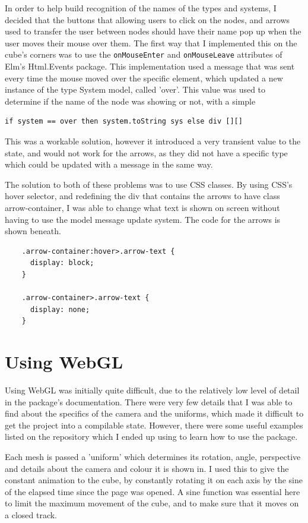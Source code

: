 \documentclass{l4proj}
\begin{document}
In order to help build recognition of the names of the types and systems, I decided that the buttons that allowing users to click on the nodes, and arrows used to transfer the user between nodes should have their name pop up when the user moves their mouse over them.  The first way that I implemented this on the cube's corners was to use the \texttt{onMouseEnter} and \texttt{onMouseLeave} attributes of Elm's Html.Events package.  This implementation used a message that was sent every time the mouse moved over the specific element, which updated a new instance of the type System model, called 'over'.  This value was used to determine if the name of the node was showing or not, with a simple 
\begin{lstlisting}
if system == over then system.toString sys else div [][]
\end{lstlisting}

This was a workable solution, however it introduced a very transient value to the state, and would not work for the arrows, as they did not have a specific type which could be updated with a message in the same way.

The solution to both of these problems was to use CSS classes.  By using CSS's hover selector, and redefining the div that contains the arrows to have class arrow-container, I was able to change what text is shown on screen without having to use the model message update system.  The code for the arrows is shown beneath.

\begin{lstlisting}
    .arrow-container:hover>.arrow-text {
      display: block;
    }

    .arrow-container>.arrow-text {
      display: none;
    }
\end{lstlisting}

\section{Using WebGL}

Using WebGL was initially quite difficult, due to the relatively low level of detail in the package's documentation.  There were very few details that I was able to find about the specifics of the camera and the uniforms, which made it difficult to get the project into a compilable state.  However, there were some useful examples listed on the repository which I ended up using to learn how to use the package.

Each mesh is passed a 'uniform' which determines its rotation, angle, perspective and details about the camera and colour it is shown in.  I used this to give the constant animation to the cube, by constantly rotating it on each axis by the sine of the elapsed time since the page was opened.  A sine function was essential here to limit the maximum movement of the cube, and to make sure that it moves on a closed track.
\end{document}
